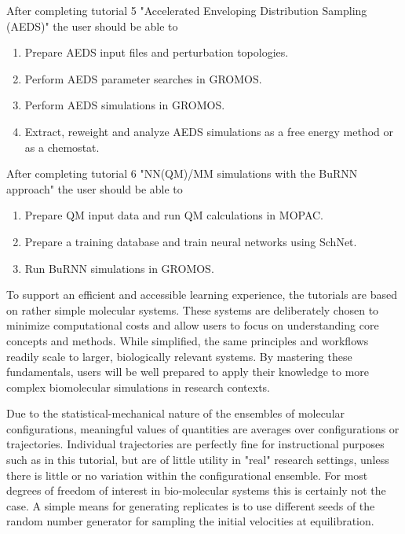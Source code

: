 %
After completing tutorial 5 "Accelerated Enveloping Distribution Sampling (AEDS)" the user should be able to
\begin{enumerate}
\item Prepare AEDS input files and perturbation topologies.
\item Perform AEDS parameter searches in GROMOS.
\item Perform AEDS simulations in GROMOS.
\item Extract, reweight and analyze AEDS simulations as a free energy method or as a chemostat.
\end{enumerate}
%
After completing tutorial 6 "NN(QM)/MM simulations with the BuRNN approach" the user should be able to
\begin{enumerate}
\item Prepare QM input data and run QM calculations in MOPAC.
\item Prepare a training database and train neural networks using SchNet.
\item Run BuRNN simulations in GROMOS.
\end{enumerate}
%

To support an efficient and accessible learning experience, the tutorials are based on rather simple molecular systems. These systems are deliberately chosen to minimize computational costs and allow users to focus on understanding core concepts and methods. While simplified, the same principles and workflows readily scale to larger, biologically relevant systems. By mastering these fundamentals, users will be well prepared to apply their knowledge to more complex biomolecular simulations in research contexts.

Due to the statistical-mechanical nature of the ensembles of molecular configurations, meaningful values of quantities are averages over configurations or trajectories. Individual trajectories are perfectly fine for instructional purposes such as in this tutorial, but are of little utility in "real" research settings, unless there is little or no variation within the configurational ensemble. 
For most degrees of freedom of interest in bio-molecular systems this is certainly not the case. A simple means for generating replicates is to use different seeds of the random number generator for sampling the initial velocities at equilibration. 



